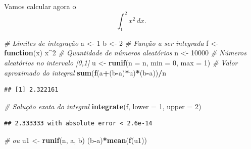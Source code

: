 \documentclass[
]{book}
\newenvironment{Shaded}{\begin{snugshade}}{\end{snugshade}}
\newcommand{\AttributeTok}[1]{\textcolor[rgb]{0.13,0.29,0.53}{#1}}
\newcommand{\CommentTok}[1]{\textcolor[rgb]{0.56,0.35,0.01}{\textit{#1}}}
\newcommand{\ControlFlowTok}[1]{\textcolor[rgb]{0.13,0.29,0.53}{\textbf{#1}}}
\newcommand{\DecValTok}[1]{\textcolor[rgb]{0.00,0.00,0.81}{#1}}
\newcommand{\FunctionTok}[1]{\textcolor[rgb]{0.13,0.29,0.53}{\textbf{#1}}}
\newcommand{\NormalTok}[1]{#1}
\newcommand{\OtherTok}[1]{\textcolor[rgb]{0.56,0.35,0.01}{#1}}
\newcommand{\SpecialCharTok}[1]{\textcolor[rgb]{0.81,0.36,0.00}{\textbf{#1}}}
\begin{document}
Vamos calcular agora o \[\int_{1}^{2} x^2\, dx.\]

\begin{Shaded}
\begin{Highlighting}[]
\CommentTok{\# Limites de integração}
\NormalTok{a }\OtherTok{\textless{}{-}} \DecValTok{1}
\NormalTok{b }\OtherTok{\textless{}{-}} \DecValTok{2}
\CommentTok{\# Função a ser integrada}
\NormalTok{f }\OtherTok{\textless{}{-}} \ControlFlowTok{function}\NormalTok{(x) x}\SpecialCharTok{\^{}}\DecValTok{2}
\CommentTok{\# Quantidade de números aleatórios}
\NormalTok{n }\OtherTok{\textless{}{-}} \DecValTok{10000}
\CommentTok{\# Números aleatórios no intervalo [0,1]}
\NormalTok{u }\OtherTok{\textless{}{-}} \FunctionTok{runif}\NormalTok{(}\AttributeTok{n =}\NormalTok{ n, }\AttributeTok{min =} \DecValTok{0}\NormalTok{, }\AttributeTok{max =} \DecValTok{1}\NormalTok{)}
\CommentTok{\# Valor aproximado do integral}
\FunctionTok{sum}\NormalTok{(}\FunctionTok{f}\NormalTok{(a}\SpecialCharTok{+}\NormalTok{(b}\SpecialCharTok{{-}}\NormalTok{a)}\SpecialCharTok{*}\NormalTok{u)}\SpecialCharTok{*}\NormalTok{(b}\SpecialCharTok{{-}}\NormalTok{a))}\SpecialCharTok{/}\NormalTok{n}
\end{Highlighting}
\end{Shaded}

\begin{verbatim}
## [1] 2.322161
\end{verbatim}

\begin{Shaded}
\begin{Highlighting}[]
\CommentTok{\# Solução exata do integral}
\FunctionTok{integrate}\NormalTok{(f, }\AttributeTok{lower =} \DecValTok{1}\NormalTok{, }\AttributeTok{upper =} \DecValTok{2}\NormalTok{)}
\end{Highlighting}
\end{Shaded}

\begin{verbatim}
## 2.333333 with absolute error < 2.6e-14
\end{verbatim}

\begin{Shaded}
\begin{Highlighting}[]
\CommentTok{\# ou}
\NormalTok{u1 }\OtherTok{\textless{}{-}} \FunctionTok{runif}\NormalTok{(n, a, b)}
\NormalTok{(b}\SpecialCharTok{{-}}\NormalTok{a)}\SpecialCharTok{*}\FunctionTok{mean}\NormalTok{(}\FunctionTok{f}\NormalTok{(u1))}
\end{Highlighting}
\end{Shaded}
\end{document}
